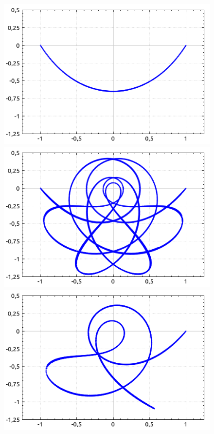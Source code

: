\documentclass[12pt]{article}
\numberwithin{equation}{section}
\begin{document}
\begin{enumerate}
\begin{figure}[h]
{			\includegraphics[scale=0.55]{1.665_1.5708}
			\includegraphics[scale=0.55]{4.175_1.5708}
			\includegraphics[scale=0.55]{4.745_1.5708}
}
\end{figure}
\end{enumerate}
\end{document}
